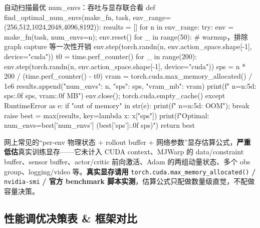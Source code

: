 \begin{codebox}[Python]{自动扫描最优 num\_envs：吞吐与显存联合看}
def find_optimal_num_envs(make_fn, task, env_range=(256,512,1024,2048,4096,8192)):
    results = []
    for n in env_range:
        try:
            env = make_fn(task, num_envs=n); env.reset()
            for _ in range(50):                          # warmup，排除 graph capture 等一次性开销
                env.step(torch.randn(n, env.action_space.shape[-1], device="cuda"))
            t0 = time.perf_counter()
            for _ in range(200):
                env.step(torch.randn(n, env.action_space.shape[-1], device="cuda"))
            sps  = n * 200 / (time.perf_counter() - t0)
            vram = torch.cuda.max_memory_allocated() / 1e6
            results.append({"num_envs": n, "sps": sps, "vram_mb": vram})
            print(f"  n={n:5d}: {sps:.0f} sps, {vram:.0f} MB")
            env.close(); torch.cuda.empty_cache()
        except RuntimeError as e:
            if "out of memory" in str(e): print(f"  n={n:5d}: OOM"); break
            raise
    best = max(results, key=lambda x: x["sps"])
    print(f"Optimal: num_envs={best['num_envs']} ({best['sps']:.0f} sps)")
    return best
\end{codebox}

\begin{note}
网上常见的“per-env 物理状态 $+$ rollout buffer $+$ 网络参数”显存估算公式，\textbf{严重低估}真实训练显存——它未计入 CUDA context、MJWarp 的 data/constraint buffer、sensor buffer、actor/critic 前向激活、Adam 的两组动量状态、多个 obs group、logging/video 等。\textbf{真实显存请用} \verb|torch.cuda.max_memory_allocated()| \textbf{/} \verb|nvidia-smi| \textbf{/ 官方 benchmark 脚本实测}，估算公式只配做数量级直觉，不配做容量决策。
\end{note}

\subsection{性能调优决策表 \& 框架对比}
\label{sec:rlmc-ls-perf-table}

